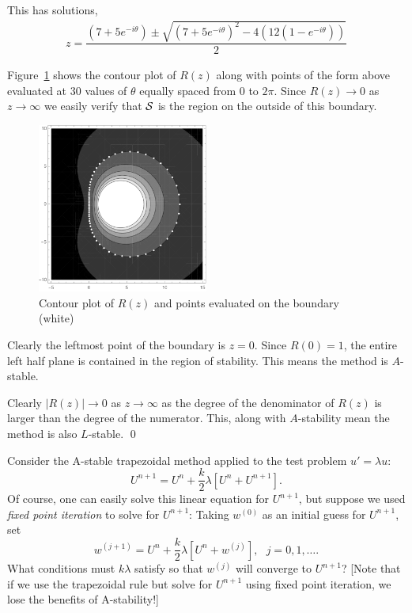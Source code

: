 \documentclass[10pt]{article}
\begin{document}
\begin{solution}[Solution]
This has solutions,
\begin{align*}
    z = \dfrac{(7+5e^{-i\theta})\pm \sqrt{(7+5e^{-i\theta})^2 - 4(12(1-e^{-i\theta}))}}{2}
\end{align*}

Figure~\ref{trbdf2} shows the contour plot of \( R(z) \) along with points of the form above evaluated at 30 values of \( \theta \) equally spaced from \( 0 \) to \( 2\pi \). Since \( R(z) \to 0 \) as \( z\to\infty \) we easily verify that \( \mathcal{S} \) is the region on the outside of this boundary.
\begin{figure}[H]\centering
    \includegraphics[width = 0.5\textwidth]{img/TRBDF2.pdf}
    \caption{Contour plot of \( R(z) \) and points evaluated on the boundary (white)}
    \label{trbdf2}
\end{figure}

Clearly the leftmost point of the boundary is \( z=0 \). Since \( R(0) = 1 \), the entire left half plane is contained in the region of stability. This means the method is \( A \)-stable.

Clearly \(  |R(z)| \to 0 \) as \( z\to\infty \) as the degree of the denominator of \( R(z) \) is larger than the degree of the numerator. This, along with \( A \)-stability  mean the method is also \( L \)-stable. \qed


\end{solution}

\begin{problem}[Problem 4]
Consider the A-stable trapezoidal method applied to the test problem \(u' = \lambda u\):
\[
U^{n+1} = U^n + \frac{k}{2} \lambda [ U^n + U^{n+1} ] .
\]
Of course, one can easily solve this linear equation for \(U^{n+1}\), but suppose we used {\em fixed point iteration} to solve for \(U^{n+1}\):  Taking \(w^{(0)}\) as an initial guess for \(U^{n+1}\), set
\[
w^{(j+1)} = U^n + \frac{k}{2} \lambda [ U^n + w^{(j)} ] ,~~~j=0, 1, \ldots .
\]
What conditions must \(k \lambda\) satisfy so that \(w^{(j)}\) will converge to \(U^{n+1}\)? [Note that if we use the trapezoidal rule but solve for \(U^{n+1}\) using fixed point iteration, we lose the benefits of A-stability!]
\end{problem}
\end{document}
